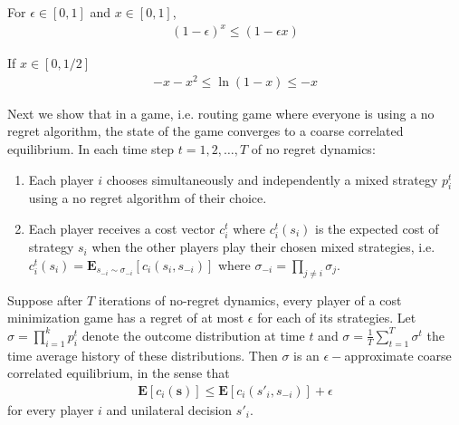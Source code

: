 \begin{lemma}
For $\epsilon \in [0,1]$ and $x \in [0,1]$, 
\begin{align*}
(1-\epsilon)^x \leq (1-\epsilon x)
\end{align*}\label{lemma:epsilon}
\end{lemma}

\begin{lemma}
If $x \in [0,1/2]$
\begin{align*}
-x-x^2 \leq \ln (1-x) \leq -x
\end{align*}\label{lemma:ln}
\end{lemma}
Next we show that in a game, i.e. routing game where everyone is using a no regret algorithm, the state of the game converges to a coarse correlated equilibrium. In each time step $t=1,2,\ldots, T$ of no regret dynamics:
\begin{enumerate}
\item Each player $i$ chooses simultaneously and independently a mixed strategy $p^t_i$ using a no regret algorithm of their choice.
\item Each player receives a cost vector $c^t_i$ where $c_i^t(s_i)$ is the expected cost of strategy $s_i$ when the other players play their chosen mixed strategies, i.e. $c^t_i(s_i)=\mathbf{E}_{s_{-i}\sim \sigma_{-i}}[c_i(s_i,s_{-i})]$ where $\sigma_{-i}=\prod_{j\neq i}\sigma_j$.
\end{enumerate}


\begin{thm}
Suppose after $T$ iterations of no-regret dynamics, every player of a cost minimization game has a regret of at most $\epsilon$ for each of its strategies. Let $\sigma=\prod_{i=1}^{k}p^t_i$ denote the outcome distribution at time $t$ and $\sigma=\frac{1}{T}\sum_{t=1}^{T}\sigma^t$ the time average history of these distributions. Then $\sigma$ is an $\epsilon-$approximate coarse correlated equilibrium, in the sense that 
\begin{align*}
\mathbf{E}[c_i(\mathbf{s})]\leq\mathbf{E}[c_i(s'_i,s_{-i})]+\epsilon
\end{align*}
for every player $i$ and unilateral decision $s'_i$.
\end{thm}


